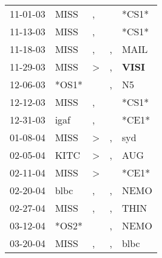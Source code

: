 \begin{supertabular}{p{0.07\textwidth}p{0.06\textwidth}p{0.02\textwidth}p{0.02\textwidth}p{0.06\textwidth}}
          11-01-03\textsuperscript{} &           MISS\textsuperscript{} &                , &                  &                            *CS1* \\
          11-13-03\textsuperscript{} &           MISS\textsuperscript{} &                , &                  &                            *CS1* \\
          11-18-03\textsuperscript{} &           MISS\textsuperscript{} &                , &                , &           MAIL\textsuperscript{} \\
          11-29-03\textsuperscript{} &           MISS\textsuperscript{} &     \textgreater &                , &  \textbf{VISI\textsuperscript{}} \\
          12-06-03\textsuperscript{} &                            *OS1* &                  &                , &             N5\textsuperscript{} \\
          12-12-03\textsuperscript{} &           MISS\textsuperscript{} &                , &                  &                            *CS1* \\
          12-31-03\textsuperscript{} &           igaf\textsuperscript{} &                , &                  &                            *CE1* \\
          01-08-04\textsuperscript{} &           MISS\textsuperscript{} &     \textgreater &                , &            syd\textsuperscript{} \\
          02-05-04\textsuperscript{} &           KITC\textsuperscript{} &     \textgreater &                , &            AUG\textsuperscript{} \\
          02-11-04\textsuperscript{} &           MISS\textsuperscript{} &     \textgreater &                  &                            *CE1* \\
          02-20-04\textsuperscript{} &           blbc\textsuperscript{} &                , &                , &           NEMO\textsuperscript{} \\
          02-27-04\textsuperscript{} &           MISS\textsuperscript{} &                , &                , &           THIN\textsuperscript{} \\
          03-12-04\textsuperscript{} &                            *OS2* &                  &                , &           NEMO\textsuperscript{} \\
          03-20-04\textsuperscript{} &           MISS\textsuperscript{} &                , &                , &           blbc\textsuperscript{} \\

\end{supertabular}
